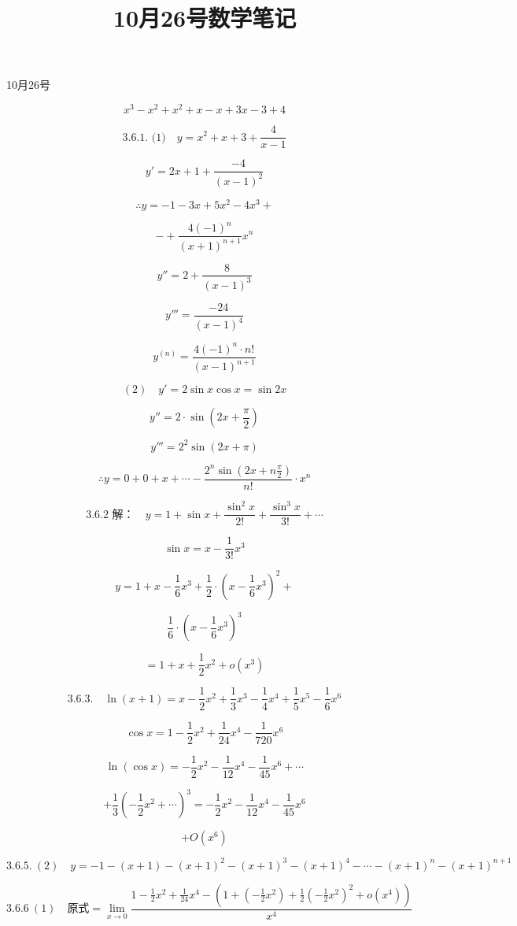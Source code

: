 \documentclass[UTF8,fontset=windows]{ctexart}
\title{10月26号数学笔记}
\begin{document}
\maketitle
10月26号

\[
x^3-x^2+x^2+x-x+3x-3+4
\]

\[
\text{3.6.1. (1)}\quad y=x^2+x+3+\frac{4}{x-1}
\]

\[
y'=2x+1+\frac{-4}{(x-1)^2}
\]

\[
\therefore y=-1-3x+5x^2-4x^3+
\]

\[
-+\frac{4(-1)^n}{(x+1)^{n+1}}x^n
\]

\[
y''=2+\frac{8}{(x-1)^3}
\]

\[
y'''=\frac{-24}{(x-1)^4}
\]

\[
y^{(n)}=\frac{4(-1)^n\cdot n!}{(x-1)^{n+1}}
\]

\[
(2)\quad y'=2\sin x\cos x=\sin 2x
\]

\[
y''=2\cdot\sin\left(2x+\frac{\pi}{2}\right)
\]

\[
y'''=2^2\sin(2x+\pi)
\]

\[
\therefore y=0+0+x+\cdots-\frac{2^n\sin(2x+n\frac{\pi}{2})}{n!}\cdot x^n
\]

\[
\text{3.6.2 解：}\quad y=1+\sin x+\frac{\sin^2 x}{2!}+\frac{\sin^3 x}{3!}+\cdots
\]

\[
\sin x=x-\frac{1}{3!}x^3
\]

\[
y=1+x-\frac{1}{6}x^3+\frac{1}{2}\cdot\left(x-\frac{1}{6}x^3\right)^2+
\]

\[
\frac{1}{6}\cdot\left(x-\frac{1}{6}x^3\right)^3
\]

\[
=1+x+\frac{1}{2}x^2+o(x^3)
\]

\[
\text{3.6.3.}\quad \ln(x+1)=x-\frac{1}{2}x^2+\frac{1}{3}x^3-\frac{1}{4}x^4+\frac{1}{5}x^5-\frac{1}{6}x^6
\]

\[
\cos x=1-\frac{1}{2}x^2+\frac{1}{24}x^4-\frac{1}{720}x^6
\]

\newpage

\[
\ln(\cos x)=-\frac{1}{2}x^2-\frac{1}{12}x^4-\frac{1}{45}x^6+\cdots
\]

\[
+\frac{1}{3}\left(-\frac{1}{2}x^2+\cdots\right)^3=-\frac{1}{2}x^2-\frac{1}{12}x^4-\frac{1}{45}x^6
\]

\[
+O(x^6)
\]

\[
3.6.5.\ (2)\quad y=-1-(x+1)-(x+1)^2-(x+1)^3-(x+1)^4-\cdots-(x+1)^n-(x+1)^{n+1}
\]

\[
3.6.6\ (1)\quad \text{原式}=\lim_{x\to0}\frac{1-\frac{1}{2}x^2+\frac{1}{24}x^4-\left(1+\left(-\frac{1}{2}x^2\right)+\frac{1}{2}\left(-\frac{1}{2}x^2\right)^2+o(x^4)\right)}{x^4}
\]
\end{document}
